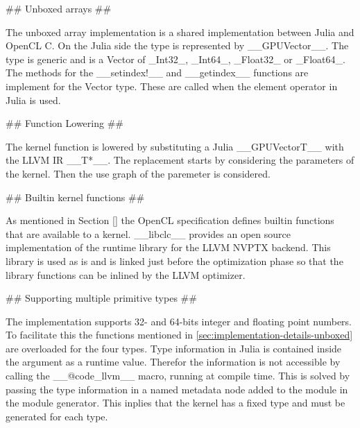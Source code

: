 \begin{markdown}
## Unboxed arrays ##
\label{sec:implementation-details-unboxed}

The unboxed array implementation is a shared implementation between
Julia and OpenCL C. On the Julia side the type is represented by
__GPUVector__. The type is generic and is a Vector of _Int32_,
_Int64_, _Float32_ or _Float64_. The methods for the __setindex!__ and
__getindex__ functions are implement for the Vector type. These are
called when the element operator in Julia is used.

## Function Lowering ##

The kernel function is lowered by substituting a Julia
__GPUVector{T}__ with the LLVM IR __T*__. The replacement starts by
considering the parameters of the kernel. Then the use graph of the
paremeter is considered. 

## Builtin kernel functions ##

As mentioned in Section \ref{} the OpenCL specification defines
builtin functions that are available to a kernel. __libclc__
\cite{libclc} provides an open source implementation of the runtime
library for the LLVM NVPTX backend. This library is used as is and is
linked just before the optimization phase so that the library functions
can be inlined by the LLVM optimizer.

## Supporting multiple primitive types ##

The implementation supports 32- and 64-bits integer and floating point
numbers. To facilitate this the functions mentioned in
\ref{sec:implementation-details-unboxed} are overloaded for the four
types. Type information in Julia is contained inside the argument as a
runtime value. Therefor the information is not accessible by calling
the __@code_llvm__ macro, running at compile time. This is solved by
passing the type information in a named metadata node added to the
module in the module generator. This inplies that the kernel has a fixed
type and must be generated for each type.

\end{markdown}
